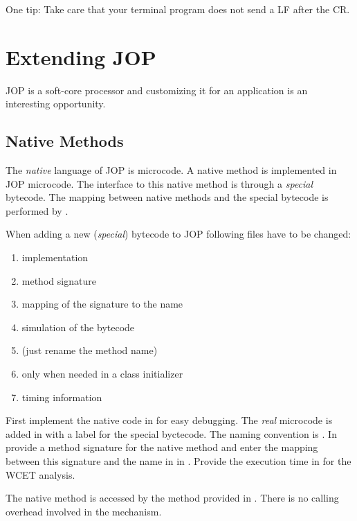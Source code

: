 One tip: Take care that your terminal program does not send a LF
after the CR.


\section{Extending JOP}

JOP is a soft-core processor and customizing it for an application
is an interesting opportunity.

\subsection{Native Methods}

The \emph{native} language of JOP is microcode. A native method is
implemented in JOP microcode. The interface to this native method is
through a \emph{special} bytecode. The mapping between native
methods and the special bytecode is performed by .

When adding a new (\emph{special}) bytecode to JOP following files
have to be changed:
\begin{enumerate}
    \item {} implementation
    \item {} method signature
    \item {} mapping of the signature to the name
    \item {} simulation of the bytecode
    \item {} (just rename the method name)
    \item {} only when needed in a class initializer
    \item {} timing information
\end{enumerate}

First implement the native code in  for easy
debugging. The \emph{real} microcode is added in  with
a label for the special byctecode. The naming convention is
. In  provide a method
signature for the native method and enter the mapping between this
signature and the name in  in .
Provide the execution time in  for the
WCET analysis.

The native method is accessed by the method provided in
. There is no calling overhead involved in the
mechanism.

